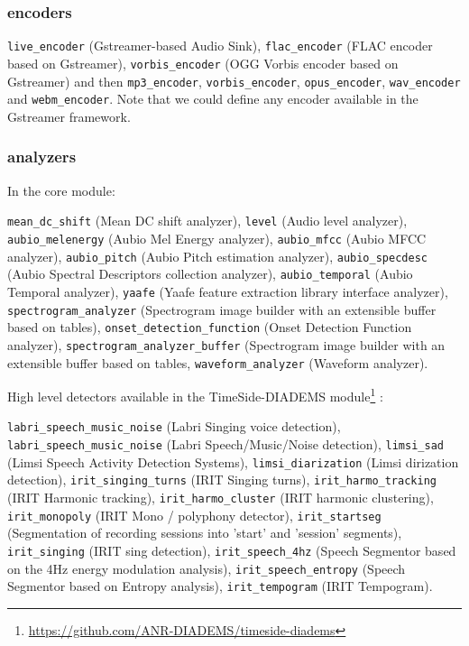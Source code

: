 \documentclass{article}
\begin{document}
\subsubsection{encoders} 

\verb|live_encoder| (Gstreamer-based Audio Sink), \verb|flac_encoder| (FLAC encoder based on Gstreamer), \verb|vorbis_encoder| (OGG Vorbis encoder based on Gstreamer) and then \verb|mp3_encoder|, \verb|vorbis_encoder|, \verb|opus_encoder|,  \verb|wav_encoder| and \verb|webm_encoder|. Note that we could define any encoder available in the Gstreamer framework. 

\subsubsection{analyzers}

In the core module:

\verb|mean_dc_shift| (Mean DC shift analyzer), \verb|level| (Audio level analyzer), \verb|aubio_melenergy| (Aubio Mel Energy analyzer), \verb|aubio_mfcc| (Aubio MFCC analyzer), \verb|aubio_pitch| (Aubio Pitch estimation analyzer), \verb|aubio_specdesc| (Aubio Spectral Descriptors collection analyzer), \verb|aubio_temporal| (Aubio Temporal analyzer), \verb|yaafe| (Yaafe feature extraction library interface analyzer), \verb|spectrogram_analyzer| (Spectrogram image builder with an extensible buffer based on tables), \verb|onset_detection_function| (Onset Detection Function analyzer), \verb|spectrogram_analyzer_buffer| (Spectrogram image builder with an extensible buffer based on tables, \verb|waveform_analyzer| (Waveform analyzer).\newline

High level detectors available in the TimeSide-DIADEMS module\footnote{\tiny{\url{https://github.com/ANR-DIADEMS/timeside-diadems}}} :

\verb|labri_speech_music_noise| (Labri Singing voice detection), \verb|labri_speech_music_noise| (Labri Speech/Music/Noise detection), \verb|limsi_sad| (Limsi Speech Activity Detection Systems), \verb|limsi_diarization| (Limsi dirization detection), \verb|irit_singing_turns| (IRIT Singing turns), \verb|irit_harmo_tracking| (IRIT Harmonic tracking), \verb|irit_harmo_cluster| (IRIT harmonic clustering), \verb|irit_monopoly| (IRIT Mono / polyphony detector), \verb|irit_startseg| (Segmentation of recording sessions into 'start' and 'session' segments), \verb|irit_singing| (IRIT sing detection), \verb|irit_speech_4hz| (Speech Segmentor based on the 4Hz energy modulation analysis), \verb|irit_speech_entropy| (Speech Segmentor based on Entropy analysis), \verb|irit_tempogram| (IRIT Tempogram).
\end{document}
